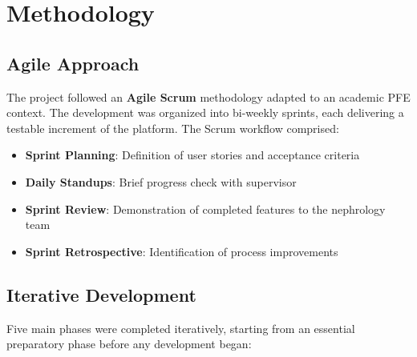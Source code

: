 \documentclass[12pt,a4paper,twoside]{report}
\begin{document}
\section{Methodology}\label{sec:methodology}

\subsection{Agile Approach}

The project followed an \textbf{Agile Scrum} methodology adapted to an academic PFE context. The development was organized into bi-weekly sprints, each delivering a testable increment of the platform. The Scrum workflow comprised:
\begin{itemize}
  \item \textbf{Sprint Planning}: Definition of user stories and acceptance criteria
  \item \textbf{Daily Standups}: Brief progress check with supervisor
  \item \textbf{Sprint Review}: Demonstration of completed features to the nephrology team
  \item \textbf{Sprint Retrospective}: Identification of process improvements
\end{itemize}

\subsection{Iterative Development}

Five main phases were completed iteratively, starting from an essential preparatory phase before any development began:
\end{document}

